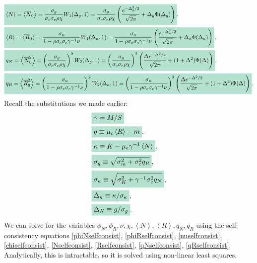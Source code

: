 \documentclass[10pt]{article}
\newcommand{\mathcolorbox}[1]{\colorbox{hlcol}{$\displaystyle #1$}}
\newcommand{\eval}[1]{\left\langle #1 \right\rangle}
\begin{document}
\begin{align}
	&
	\label{Nselfconsist}
	\mathcolorbox{
	\eval{N}
	=
	\eval{
		\overline N_0
	}
	=
	\frac{\sigma_g}{\sigma_c\sigma_e\rho\chi}
	W_1(\Delta_g,1)
	=
	\frac{\sigma_g}{\sigma_c\sigma_e\rho\chi}
	\left(
		\frac{e^{-\Delta_g^2/2}}{\sqrt{2\pi}}
		+
		\Delta_g \Phi(\Delta_g)
	\right)},
	\\
	&
	\label{Rselfconsist}
	\mathcolorbox{\eval{R}
	=
	\eval{\overline R_0}
	=
	\frac{\sigma_\kappa}{1-\rho \sigma_e \sigma_c \gamma^{-1}\nu}
	W_1(\Delta_\kappa,1)
	=
	\frac{\sigma_\kappa}{1-\rho \sigma_e \sigma_c \gamma^{-1}\nu}
	\left(
		\frac{e^{-\Delta_\kappa^2/2}}{\sqrt{2\pi}}
		+
		\Delta_\kappa \Phi(\Delta_\kappa)
	\right)},
	\\
	&
	\label{qNselfconsist}
	\mathcolorbox{
	q_N
	=
	\eval{\overline N_0^2}
	=
	\left(
		\frac{\sigma_g}{\sigma_c\sigma_e\rho\chi}
	\right)^2
	W_2(\Delta_g,1)
	=
	\left(
		\frac{\sigma_g}{\sigma_c\sigma_e\rho\chi}
	\right)^2
	\left(
		\frac{\Delta e^{-\Delta^2/2}}{\sqrt{2\pi}}
		+
		(1+\Delta^2)
		\Phi(\Delta)
	\right)},
	\\
	&
	\label{qRselfconsist}
	\mathcolorbox{
	q_R
	=
	\eval{\overline R_0^2}
	=
	\left(
		\frac{\sigma_\kappa}{1-\rho \sigma_e \sigma_c \gamma^{-1}\nu}
	\right)^2
	W_2(\Delta_\kappa,1)
	=
	\left(
		\frac{\sigma_\kappa}{1-\rho \sigma_e \sigma_c \gamma^{-1}\nu}
	\right)^2
	\left(
		\frac{\Delta e^{-\Delta^2/2}}{\sqrt{2\pi}}
		+
		(1+\Delta^2)\Phi(\Delta)
	\right)}.
\end{align}
Recall the substitutions we made earlier:
\begin{align}
	&\mathcolorbox{\gamma = M/S}
	\\
	&
	\mathcolorbox{
		g 
	\equiv
	\mu_c \eval{R}
	-
	m},
	\\
	&
	\mathcolorbox{
	\kappa
	\equiv
	K 
	-
	\mu_e \gamma^{-1} \eval{N}},
	\\
	&
	\mathcolorbox{
		\sigma_g
		\equiv
		\sqrt{\sigma_m^2 + \sigma_c^2 q_R}
	},
	\\
	&
	\mathcolorbox{
		\sigma_\kappa \equiv
		\sqrt{\sigma_K^2 + \gamma^{-1}\sigma_e^2 q_N}
	},
	\\
	&
	\mathcolorbox{
		\Delta_\kappa \equiv \kappa/\sigma_\kappa
	},
	\\
	&
	\mathcolorbox{
		\Delta_N \equiv g/\sigma_g
	}.
\end{align}
We can solve for the variables $\phi_N, \phi_R, \nu, \chi, \eval{N}, \eval{R}, q_N, q_R$ using the self-consistency equations \ref{phiNselfconsist}, \ref{phiRselfconsist}, \ref{nuselfconsist}, \ref{chiselfconsist}, \ref{Nselfconsist}, \ref{Rselfconsist}, \ref{qNselfconsist}, \ref{qRselfconsist}.
Analytically, this is intractable, so it is solved using non-linear least squares.
\end{document}
